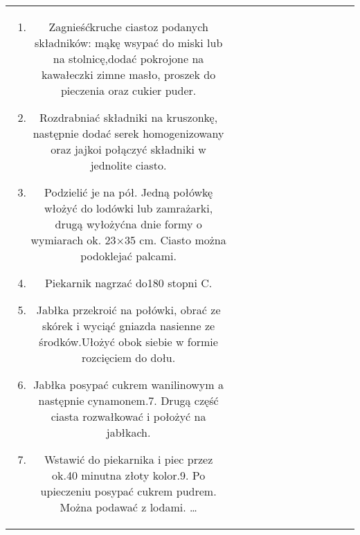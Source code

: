 \documentclass[12pt, letterpaper, titlepage]{article}
\begin{document}
\begin{table}[h]
\begin{tabular}{c c c c c c c c c c c c}
\begin{enumerate}
  \item  Zagnieśćkruche ciastoz podanych składników: mąkę wsypać do miski lub na stolnicę,dodać pokrojone na kawałeczki zimne masło, proszek do pieczenia oraz cukier puder.
   \item Rozdrabniać składniki na kruszonkę, następnie dodać serek homogenizowany oraz jajkoi połączyć składniki w jednolite ciasto.
   \item Podzielić je na pół. Jedną połówkę włożyć do lodówki lub zamrażarki, drugą wyłożyćna dnie formy o wymiarach ok. 23×35 cm. Ciasto można podoklejać palcami.
   \item Piekarnik nagrzać do180 stopni C.
   \item Jabłka przekroić na połówki, obrać ze skórek i wyciąć gniazda nasienne ze środków.Ułożyć obok siebie w formie rozcięciem do dołu.
   \item Jabłka posypać cukrem wanilinowym a następnie cynamonem.7. Drugą część ciasta rozwałkować i położyć na jabłkach.
   \item Wstawić do piekarnika i piec przez ok.40 minutna złoty kolor.9. Po upieczeniu posypać cukrem pudrem. Można podawać z lodami.
   \ldots
\end{enumerate}


\end{tabular}
\end{table}
\end{document}
